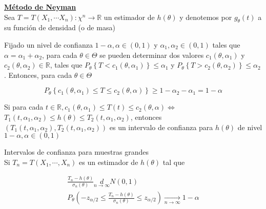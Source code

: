 \underline{\textbf{Método de Neyman}}\\
Sea $T=T\left(X_{1}, \cdots X_{n}\right): \chi^{n} \rightarrow \mathbb{R}$ un
estimador de $h(\theta)$ y denotemos por $g_{\theta}(t)$ a su función de
densidad (o de masa)

Fijado un nivel de confianza $1-\alpha, \alpha \in(0,1)$ y $\alpha_{1},
    \alpha_{2} \in(0,1)$ tales que $\alpha=\alpha_{1}+\alpha_{2}$, para cada
$\theta \in \Theta$ se pueden determinar dos valores $c_{1}\left(\theta,
    \alpha_{1}\right)$ y $c_{2}\left(\theta, \alpha_{2}\right) \in \mathbb{R}$,
tales que $P_{\theta}\left\{T<c_{1}\left(\theta, \alpha_{1}\right)\right\} \leq
    \alpha_{1}$ y $P_{\theta}\left\{T>c_{2}\left(\theta, \alpha_{2}\right)\right\}
    \leq \alpha_{2}$. Entonces, para cada $\theta \in \Theta$

$$
    P_{\theta}\left\{c_{1}\left(\theta, \alpha_{1}\right) \leq T \leq c_{2}(\theta, \alpha)\right\} \geq 1-\alpha_{2}-\alpha_{1}=1-\alpha
$$

Si para cada $t \in \mathbb{R}, c_{1}\left(\theta, \alpha_{1}\right) \leq T(t)
    \leq c_{2}(\theta, \alpha) \Leftrightarrow$\\ $T_{1}\left(t, \alpha_{1},
    \alpha_{2}\right) \leq h(\theta) \leq T_{2}\left(t, \alpha_{1},
    \alpha_{2}\right)$, entonces\\ $\left(T_{1}\left(t, \alpha_{1},
    \alpha_{2}\right), T_{2}\left(t, \alpha_{1}, \alpha_{2}\right)\right)$ es un
intervalo de confianza para $h(\theta)$ de nivel $1-\alpha, \alpha \in(0,1)$


Intervalos de confianza para muestras grandes\\ Si $T_{n}=T\left(X_{1}, \cdots,
    X_{n}\right)$ es un estimador de $h(\theta)$ tal que

$$
    \begin{gathered}
        \frac{T_{n}-h(\theta)}{\sigma_{n}(\theta)} \underset{n \rightarrow \infty}{d} N(0,1) \\
        P_{\theta}\left(-z_{\alpha / 2} \leq \frac{T_{n}-h(\theta)}{\sigma_{n}(\theta)} \leq z_{\alpha / 2}\right) \underset{n \rightarrow \infty}{\longrightarrow} 1-\alpha
    \end{gathered}
$$

